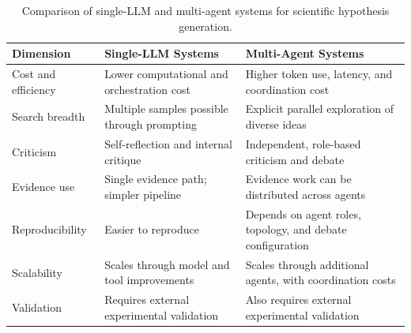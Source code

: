 \documentclass[acmsmall,screen,review]{acmart}
\begin{document}
\begin{table}[htbp]
  \centering
  \caption{Comparison of single-LLM and multi-agent systems for scientific hypothesis generation.}
  \label{tab:system-comparison}
  \small
  \renewcommand{\arraystretch}{1.2}
  \begin{tabularx}{\textwidth}{@{}>{\raggedright\arraybackslash}p{}
                                  >{\raggedright\arraybackslash}X
                                  >{\raggedright\arraybackslash}X@{}}
    \toprule
    \textbf{Dimension} & \textbf{Single-LLM Systems} & \textbf{Multi-Agent Systems} \\
    \midrule
    Cost and efficiency & Lower computational and orchestration cost
                        & Higher token use, latency, and coordination cost \\
    Search breadth      & Multiple samples possible through prompting
                        & Explicit parallel exploration of diverse ideas \\
    Criticism           & Self-reflection and internal critique
                        & Independent, role-based criticism and debate \\
    Evidence use        & Single evidence path; simpler pipeline
                        & Evidence work can be distributed across agents \\
    Reproducibility     & Easier to reproduce
                        & Depends on agent roles, topology, and debate configuration \\
    Scalability         & Scales through model and tool improvements
                        & Scales through additional agents, with coordination costs \\
    Validation          & Requires external experimental validation
                        & Also requires external experimental validation \\
    \bottomrule
  \end{tabularx}
\end{table}
\end{document}
